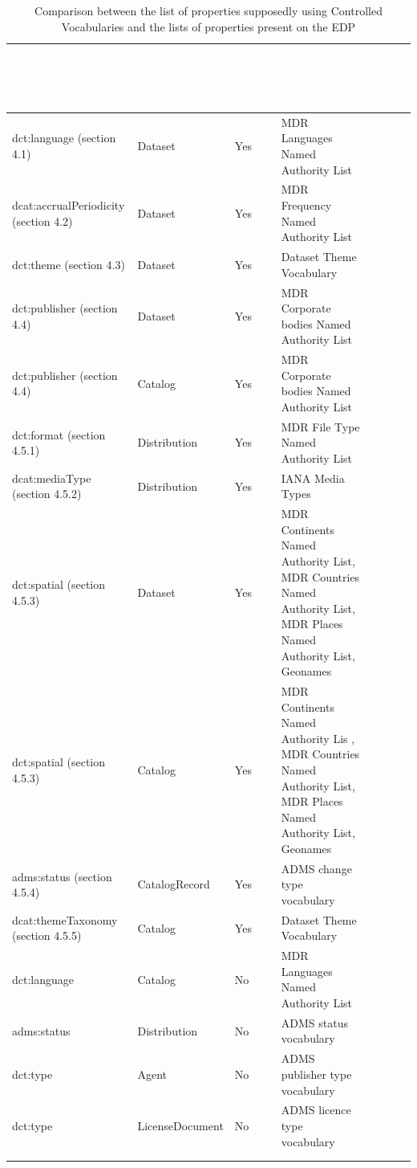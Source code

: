 \documentclass[<options>]{elsarticle}
\begin{document}
\begin{longtable}{*8l}
\rowcolor{blue!90}
\textcolor{white}{\textbf{Property}} & \textcolor{white}{\textbf{Class}} & \textcolor{white}{\textbf{Used on the EDP?}} & \textcolor{white}{\textbf{Controlled Vocabulary}} \\ \hline
\rowcolor{gray!10} dct:language (section 4.1) &Dataset &Yes &MDR Languages Named Authority List \\ \hline
\rowcolor{gray!10} dcat:accrualPeriodicity (section 4.2) &Dataset &Yes &MDR Frequency Named Authority List \\ \hline
\rowcolor{gray!10} dct:theme (section 4.3) &Dataset &Yes &Dataset Theme Vocabulary \\ \hline
\rowcolor{gray!10} dct:publisher (section 4.4) &Dataset &Yes &MDR Corporate bodies Named Authority List \\ \hline
\rowcolor{gray!10} dct:publisher (section 4.4) &Catalog &Yes &MDR Corporate bodies Named Authority List \\ \hline
\rowcolor{gray!10} dct:format (section 4.5.1) &Distribution &Yes &MDR File Type Named Authority List\\ \hline
\rowcolor{gray!10} dcat:mediaType (section 4.5.2) &Distribution &Yes &IANA Media Types \\ \hline
\rowcolor{gray!10} dct:spatial (section 4.5.3) &Dataset &Yes &MDR Continents Named Authority List, MDR Countries Named Authority List, MDR Places Named Authority List, Geonames \\ \hline
\rowcolor{gray!10} dct:spatial (section 4.5.3) &Catalog &Yes &MDR Continents Named Authority Lis , MDR Countries Named Authority List, MDR Places Named Authority List, Geonames \\ \hline
\rowcolor{gray!10} adms:status (section 4.5.4) &CatalogRecord &Yes &ADMS change type vocabulary \\ \hline
\rowcolor{gray!10} dcat:themeTaxonomy (section 4.5.5) &Catalog &Yes &Dataset Theme Vocabulary \\ \hline
\rowcolor{gray!10} dct:language &Catalog &No &MDR Languages Named Authority List \\ \hline
\rowcolor{gray!10} adms:status &Distribution &No &ADMS status vocabulary \\ \hline
\rowcolor{gray!10} dct:type &Agent &No &ADMS publisher type vocabulary \\ \hline
\rowcolor{gray!10} dct:type &LicenseDocument &No &ADMS licence type vocabulary \\ \hline

\\ 
\caption{Comparison between the list of properties supposedly using Controlled Vocabularies and the lists of properties present on the EDP}
\end{longtable}
\end{document}
